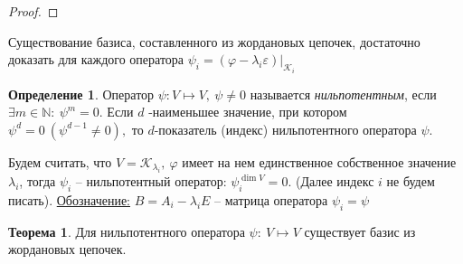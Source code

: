 \documentclass[a4paper, 12pt]{article}
\theoremstyle{definition}
\newtheorem*{definition}{Определение}
\newtheorem*{theorem}{Теорема}
\begin{document}
\begin{proof}
    \end{proof}
    Существование базиса, составленного из жордановых цепочек,
    достаточно доказать для каждого оператора $\psi_i = 
    (\varphi - \lambda_i \varepsilon)|_{\mathcal{K}_i}$ 
    \begin{definition}
        Оператор $\psi: V \longmapsto V,\ \psi \neq 0$ 
        называется \textit{нильпотентным}, если $\exists
        m \in \mathbb{N}:\ \psi^m = 0$. Если $d$ -наименьшее
        значение, при котором\\ $\psi^d = 0\ (\psi^{d-1} \neq 0),$
        то $d$-показатель (индекс) нильпотентного оператора $\psi$.  
    \end{definition}
    Будем считать, что $V = \mathcal{K}_{\lambda_i},\ \varphi$
    имеет на нем единственное собственное значение $\lambda_i$,
    тогда $\psi_i$ -- нильпотентный оператор: $\psi_i^{\dim V} = 0.$
    (Далее индекс $i$ не будем писать). 
    \underline{Обозначение:} $B = A_i - \lambda_i E$ --
    матрица оператора $\psi_i = \psi$
    \newpage
    \begin{theorem}
        Для нильпотентного оператора $\psi:\ V \longmapsto V$
        существует базис из жордановых цепочек.
    \end{theorem}  
\end{document}

